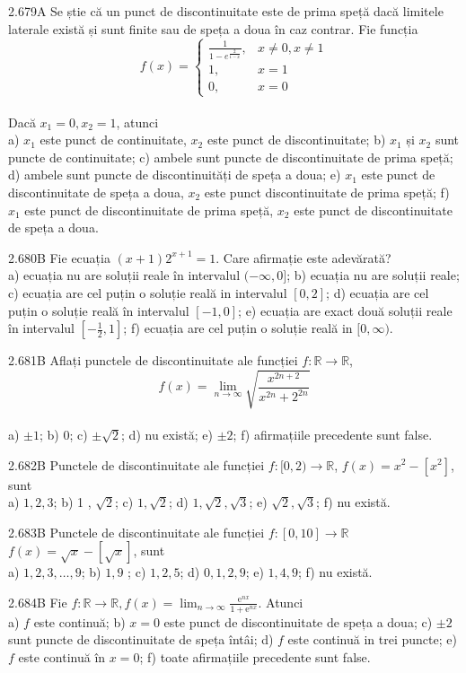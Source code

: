 \documentclass[11pt]{article}
\begin{document}
2.679A Se știe că un punct de discontinuitate este de prima speță dacă limitele laterale există și sunt finite sau de speța a doua în caz contrar. Fie funcția $$f(x)= \begin{cases}\frac{1}{1-e^{\frac{2}{1-x}}}, & x \neq 0, x \neq 1 \\ 1, & x=1 \\ 0, & x=0\end{cases}$$\\Dacă $x_{1}=0, x_{2}=1$, atunci\\ a) $x_{1}$ este punct de continuitate, $x_{2}$ este punct de discontinuitate; b) $x_{1}$ și $x_{2}$ sunt puncte de continuitate; c) ambele sunt puncte de discontinuitate de prima speță; d) ambele sunt puncte de discontinuități de speța a doua; e) $x_{1}$ este punct de discontinuitate de speța a doua, $x_{2}$ este punct discontinuitate de prima speță; f) $x_{1}$ este punct de discontinuitate de prima speță, $x_{2}$ este punct de discontinuitate de speța a doua.

2.680B Fie ecuația $(x+1) 2^{x+1}=1$. Care afirmație este adevărată?\\ a) ecuația nu are soluții reale în intervalul $(-\infty, 0]$; b) ecuația nu are soluții reale; c) ecuația are cel puțin o soluție reală in intervalul $[0,2]$; d) ecuația are cel puțin o soluție reală în intervalul $[-1,0]$; e) ecuația are exact două soluții reale în intervalul $\left[-\frac{1}{2}, 1\right]$; f) ecuația are cel puțin o soluție reală in $[0, \infty)$.

2.681B Aflați punctele de discontinuitate ale funcției $f: \mathbb{R} \rightarrow \mathbb{R}$, $$f(x)=\lim _{n \rightarrow \infty} \sqrt{\frac{x^{2 n+2}}{x^{2 n}+2^{2 n}}}$$\\ a) $\pm 1$; b) $0$; c) $\pm \sqrt{2}$; d) nu există; e) $\pm 2$; f) afirmațiile precedente sunt false.

2.682B Punctele de discontinuitate ale funcției $f:[0,2) \rightarrow \mathbb{R}$, $f(x)=x^{2}-\left[x^{2}\right]$, sunt\\ a) $1,2,3$; b) 1 , $\sqrt{2}$; c) $1, \sqrt{2}$; d) $1, \sqrt{2}, \sqrt{3}$; e) $\sqrt{2}, \sqrt{3}$; f) nu există.

2.683B Punctele de discontinuitate ale funcției $f:[0,10] \rightarrow \mathbb{R}$ $f(x)=\sqrt{x}-[\sqrt{x}]$, sunt\\ a) $1,2,3, \ldots, 9$; b) $1,9$ ; c) $1,2,5$; d) $0,1,2,9$; e) $1,4,9$; f) nu există.

2.684B Fie $f: \mathbb{R} \rightarrow \mathbb{R}, f(x)=\lim _{n \rightarrow \infty} \frac{\mathrm{e}^{n x}}{1+\mathrm{e}^{n x}}$. Atunci\\ a) $f$ este continuă; b) $x=0$ este punct de discontinuitate de speța a doua; c) $\pm 2$ sunt puncte de discontinuitate de speța întâi; d) $f$ este continuă in trei puncte; e) $f$ este continuă în $x=0$; f) toate afirmațiile precedente sunt false.
\end{document}
